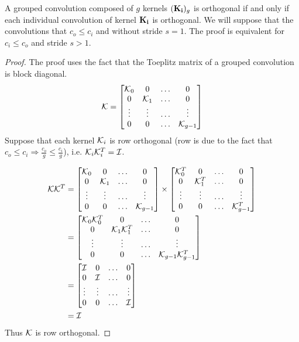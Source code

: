 A grouped convolution composed of $g$ kernels $(\mathbf{K_i})_g$ is orthogonal if and only if each individual convolution of kernel $\mathbf{K_i}$ is orthogonal.
We will suppose that the convolutions that $c_o\leq c_i$ and without stride $s=1$. The proof is equivalent for $c_i\leq c_o$ and stride $s>1$.
\begin{proof}
    The proof uses the fact that the Toeplitz matrix of a grouped convolution is block diagonal. 
    \[
    \mathcal{K} = \begin{bmatrix}
    \mathcal{K}_0 & 0 & \hdots & 0 \\
    0 & \mathcal{K}_1 &  \hdots & 0 \\
    
    \vdots & \vdots & \hdots & \vdots \\
    0 & 0 & \hdots & \mathcal{K}_{g-1} \\
    
    \end{bmatrix}
    \]
    Suppose that each kernel $\mathcal{K}_i$ is  row orthogonal (row is due to the fact that  $c_o \leq c_i \Rightarrow \frac{c_o}{g}\leq \frac{c_i}{g}$), i.e. $\mathcal{K}_i\mathcal{K}_i^T=\mathcal{I}$. 
    
\begin{align*}
\mathcal{K}\mathcal{K}^T &= \begin{bmatrix}
    \mathcal{K}_0 & 0 & \hdots & 0 \\
    0 & \mathcal{K}_1 &  \hdots & 0 \\
    \vdots & \vdots & \hdots & \vdots \\
    0 & 0 & \hdots & \mathcal{K}_{g-1} 
    \end{bmatrix} \times \begin{bmatrix}
    \mathcal{K}_0^T & 0 & \hdots & 0 \\
    0 & \mathcal{K}_1^T &  \hdots & 0 \\
    \vdots & \vdots & \hdots & \vdots \\
    0 & 0 & \hdots & \mathcal{K}_{g-1}^T
    \end{bmatrix} \\
    & = \begin{bmatrix}
    \mathcal{K}_0\mathcal{K}_0^T & 0 & \hdots & 0 \\
    0 & \mathcal{K}_1\mathcal{K}_1^T &  \hdots & 0 \\
    \vdots & \vdots & \hdots & \vdots \\
    0 & 0 & \hdots & \mathcal{K}_{g-1}\mathcal{K}_{g-1}^T
    \end{bmatrix} \\
    & = \begin{bmatrix}
    \mathcal{I} & 0 & \hdots & 0 \\
    0 & \mathcal{I} &  \hdots & 0 \\
    \vdots & \vdots & \hdots & \vdots \\
    0 & 0 & \hdots & \mathcal{I}
    \end{bmatrix} \\
    &= \mathcal{I}
\end{align*}
    Thus $\mathcal{K}$ is row orthogonal.
    

\end{proof}
